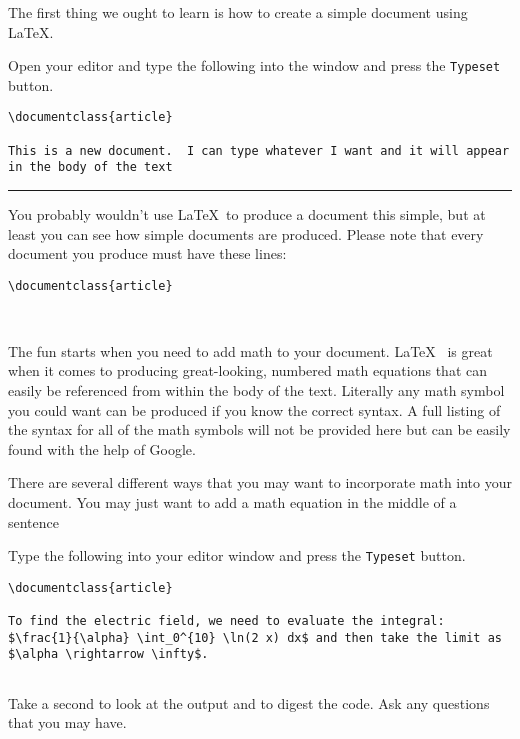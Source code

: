 The first thing we ought to learn is how to create a simple document
using \LaTeX.  

\begin{enumerate}
\probtwo Open your editor and type the following into the
window and press the \verb!Typeset! button.

\begin{Verbatim}
\documentclass{article}

This is a new document.  I can type whatever I want and it will appear
in the body of the text

\end{Verbatim}
\end{enumerate}
 

\noindent\rule{5 in}{0.01 in}

You probably wouldn't use \LaTeX ~to produce a document this simple,
but at least you can see how simple documents are produced. Please
note that every document you produce must have these lines:
\begin{Verbatim}
\documentclass{article}



\end{Verbatim}


 The fun starts when you need to add math to your
document.  \LaTeX ~ is great when it comes to producing great-looking,
numbered math equations that can easily be referenced from within the
body of the text.  Literally any math symbol you could want can be
produced if you know the correct syntax.  A full listing of the syntax
for all of the math symbols will not be provided here but can be
easily found with the help of Google.  

There are several different ways that you may want to incorporate math
into your document.  You may just want to add a math equation in the
middle of a sentence

\begin{enumerate}
\probtwo Type the following into your editor window and press the \verb!Typeset! button.
\begin{Verbatim}
\documentclass{article}

To find the electric field, we need to evaluate the integral:
$\frac{1}{\alpha} \int_0^{10} \ln(2 x) dx$ and then take the limit as
$\alpha \rightarrow \infty$.


\end{Verbatim}
Take a second to look at the output and to digest the code.  Ask any
questions that you may have.
\end{enumerate}

